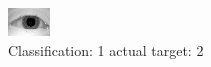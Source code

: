 \begin{figure}[h!]
\begin{center}
\includegraphics[width=0.60\columnwidth]{figures/ID898_class_1_target_2.png}
\end{center}
\caption{ Classification: 1 actual target: 2}
\label{fig:ID898_class_1_target_2}
\end{figure}
